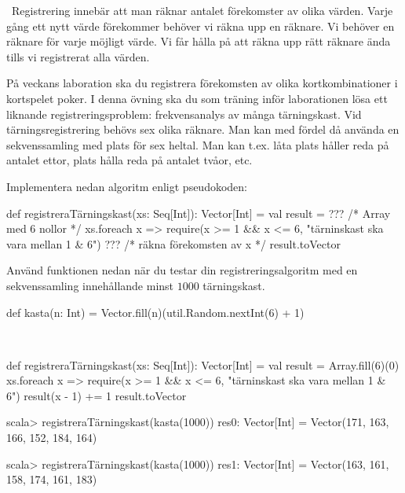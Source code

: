 \QUESTEND





\QUESTBEGIN

\Task \what~Registrering innebär att man räknar antalet förekomster av olika värden. Varje gång ett nytt värde förekommer behöver vi räkna upp en räknare. Vi behöver en räknare för varje möjligt värde. Vi får hålla på att räkna upp rätt räknare ända tills vi registrerat alla värden.

På veckans laboration ska du registrera förekomsten av olika kortkombinationer i kortspelet poker. I denna övning ska du som träning inför laborationen lösa ett liknande registreringsproblem:  frekvensanalys av många tärningskast. Vid tärningsregistrering behövs sex olika räknare. Man kan med fördel då använda en sekvenssamling med plats för sex heltal. Man kan t.ex. låta  plats  håller reda på antalet ettor, plats  hålla reda på antalet tvåor, etc.

\Subtask Implementera nedan algoritm enligt pseudokoden:
\begin{Code}
def registreraTärningskast(xs: Seq[Int]): Vector[Int] = {
  val result = ??? /* Array med 6 nollor */
  xs.foreach{ x =>
    require(x >= 1 && x <= 6, "tärninskast ska vara mellan 1 & 6")
    ??? /* räkna förekomsten av x */
  }
  result.toVector
}
\end{Code}

\Subtask Använd funktionen  nedan när du testar din registreringsalgoritm med en sekvenssamling innehållande minst $1000$ tärningskast.
\begin{Code}
def kasta(n: Int) = Vector.fill(n)(util.Random.nextInt(6) + 1)
\end{Code}

\SOLUTION

\TaskSolved \what~

\SubtaskSolved
\begin{Code}
def registreraTärningskast(xs: Seq[Int]): Vector[Int] = {
  val result = Array.fill(6)(0)
  xs.foreach{ x =>
    require(x >= 1 && x <= 6, "tärninskast ska vara mellan 1 & 6")
    result(x - 1) += 1
  }
  result.toVector
}
\end{Code}

\SubtaskSolved
\begin{REPL}
scala> registreraTärningskast(kasta(1000))
res0: Vector[Int] = Vector(171, 163, 166, 152, 184, 164)

scala> registreraTärningskast(kasta(1000))
res1: Vector[Int] = Vector(163, 161, 158, 174, 161, 183)
\end{REPL}

